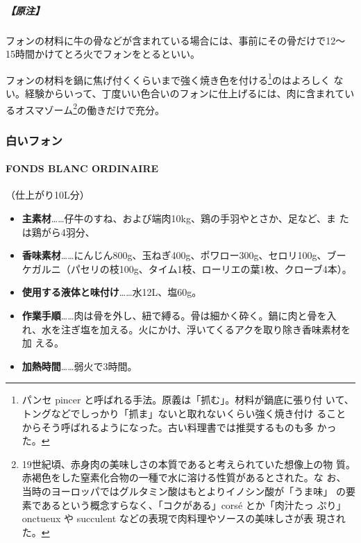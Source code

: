 \begin{recette}
\hypertarget{ux539fux6ce8}{%
\subparagraph{【原注】}\label{ux539fux6ce8}}

フォンの材料に牛の骨などが含まれている場合には、事前にその骨だけで12〜
15時間かけてとろ火でフォンをとるといい。

フォンの材料を鍋に焦げ付くくらいまで強く焼き色を付ける\footnote{パンセ
  pincer と呼ばれる手法。原義は「抓む」。材料が鍋底に張り付
  いて、トングなどでしっかり「抓ま」ないと取れないくらい強く焼き付け
  ることからそう呼ばれるようになった。古い料理書では推奨するものも多
  かった。}のはよろしく
ない。経験からいって、丁度いい色合いのフォンに仕上げるには、肉に含まれてい
るオスマゾーム\footnote{19世紀頃、赤身肉の美味しさの本質であると考えられていた想像上の物
  質。赤褐色をした窒素化合物の一種で水に溶ける性質があるとされた。な
  お、当時のヨーロッパではグルタミン酸はもとよりイノシン酸が「うま味」
  の要素であるという概念すらなく、「コクがある」corsé とか「肉汁たっ
  ぷり」onctueux や succulent などの表現で肉料理やソースの美味しさが表
  現された。}の働きだけで充分。

\maeaki

\hypertarget{ux767dux3044ux30d5ux30a9ux30f3}{%
\subsubsection{白いフォン}\label{ux767dux3044ux30d5ux30a9ux30f3}}

\hypertarget{fonds-blanc}{%
\paragraph{FONDS BLANC ORDINAIRE}\label{fonds-blanc}}


（仕上がり10L分）

\begin{itemize}
\item
  \textbf{主素材}\ldots{}\ldots{}仔牛のすね、および端肉10kg、鶏の手羽やとさか、足など、ま
  たは鶏がら4羽分、
\item
  \textbf{香味素材}\ldots{}\ldots{}にんじん800g、玉ねぎ400g、ポワロー300g、セロリ100g、ブー
  ケガルニ（パセリの枝100g、タイム1枝、ローリエの葉1枚、クローブ4本）。
\item
  \textbf{使用する液体と味付け}\ldots{}\ldots{}水12L、塩60g。
\item
  \textbf{作業手順}\ldots{}\ldots{}肉は骨を外し、紐で縛る。骨は細かく砕く。鍋に肉と骨を入
  れ、水を注ぎ塩を加える。火にかけ、浮いてくるアクを取り除き香味素材を加
  える。
\item
  \textbf{加熱時間}\ldots{}\ldots{}弱火で3時間。
\end{itemize}


\end{recette}

